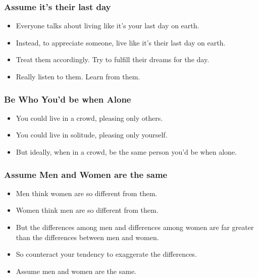 \begin{frame}[fragile]\frametitle{Assume it's their last day}

\begin{itemize}
\item Everyone talks about living like it’s your last day on earth.
\item Instead, to appreciate someone, live like it’s their last day on earth.
\item Treat them accordingly. Try to fulfill their dreams for the day.
\item Really listen to them. Learn from them.
\end{itemize}

\end{frame}

\begin{frame}[fragile]\frametitle{Be Who You'd be when Alone}

\begin{itemize}
\item You could live in a crowd, pleasing only others.
\item You could live in solitude, pleasing only yourself.
\item But ideally, when in a crowd, be the same person you’d be when alone.
\end{itemize}

\end{frame}

\begin{frame}[fragile]\frametitle{Assume Men and Women are the same}

\begin{itemize}
\item Men think women are so different from them.
\item Women think men are so different from them.
\item But the differences among men and differences among women are far greater than the differences between men and women.
\item So counteract your tendency to exaggerate the differences.
\item Assume men and women are the same.
\end{itemize}

\end{frame}

